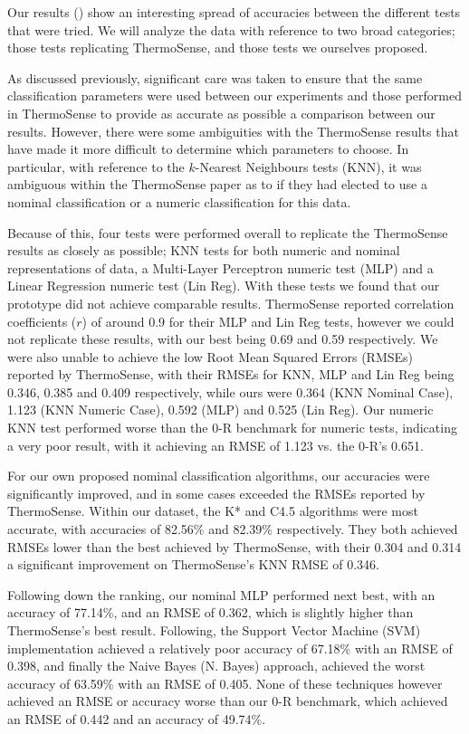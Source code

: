\documentclass[../thesis/thesis.tex]{subfiles}
\begin{document}
Our results () show an interesting spread of accuracies between the different tests that were tried. We will analyze the data with reference to two broad categories; those tests replicating ThermoSense, and those tests we ourselves proposed.

As discussed previously, significant care was taken to ensure that the same classification parameters were used between our experiments and those performed in ThermoSense to provide as accurate as possible a comparison between our results. However, there were some ambiguities with the ThermoSense results that have made it more difficult to determine which parameters to choose. In particular, with reference to the $k$-Nearest Neighbours tests (KNN), it was ambiguous within the ThermoSense paper as to if they had elected to use a nominal classification or a numeric classification for this data.

Because of this, four tests were performed overall to replicate the ThermoSense results as closely as possible; KNN tests for both numeric and nominal representations of data, a Multi-Layer Perceptron numeric test (MLP) and a Linear Regression numeric test (Lin Reg). With these tests we found that our prototype did not achieve comparable results. ThermoSense reported correlation coefficients ($r$) of around 0.9 for their MLP and Lin Reg tests, however we could not replicate these results, with our best being 0.69 and 0.59 respectively. We were also unable to achieve the low Root Mean Squared Errors (RMSEs) reported by ThermoSense, with their RMSEs for KNN, MLP and Lin Reg being 0.346, 0.385 and 0.409 respectively, while ours were 0.364 (KNN Nominal Case), 1.123 (KNN Numeric Case), 0.592 (MLP) and 0.525 (Lin Reg). Our numeric KNN test performed worse than the 0-R benchmark for numeric tests, indicating a very poor result, with it achieving an RMSE of 1.123 vs. the 0-R's 0.651.

For our own proposed nominal classification algorithms, our accuracies were significantly improved, and in some cases exceeded the RMSEs reported by ThermoSense. Within our dataset, the K* and C4.5 algorithms were most accurate, with accuracies of 82.56\% and 82.39\% respectively. They both achieved RMSEs lower than the best achieved by ThermoSense, with their 0.304 and 0.314 a significant improvement on ThermoSense's KNN RMSE of 0.346.

Following down the ranking, our nominal MLP performed next best, with an accuracy of 77.14\%, and an RMSE of 0.362, which is slightly higher than ThermoSense's best result. Following, the Support Vector Machine (SVM) implementation achieved a relatively poor accuracy of 67.18\% with an RMSE of 0.398, and finally the Naive Bayes (N. Bayes) approach, achieved the worst accuracy of 63.59\% with an RMSE of 0.405. None of these techniques however achieved an RMSE or accuracy worse than our 0-R benchmark, which achieved an RMSE of 0.442 and an accuracy of 49.74\%.
\end{document}
